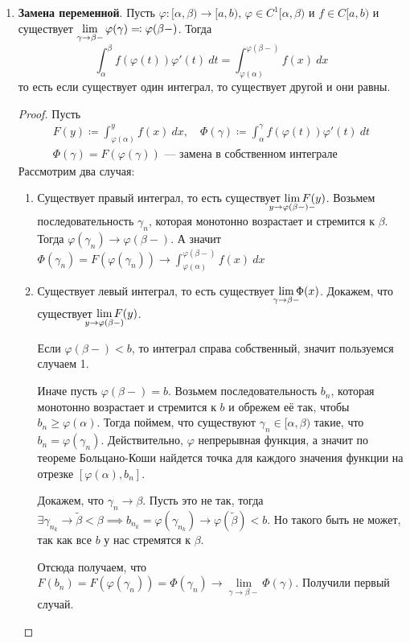 \begin{enumerate}
    \item \textbf{Замена переменной}. Пусть $\varphi\colon [\alpha, \beta) \to [a, b),\, \varphi \in C^{1}[\alpha, \beta)$ и $f \in C[a, b)$ и существует $\lim\limits_{\gamma \to \beta-}
  \varphi(\gamma) \leftcoleqq \varphi(\beta-)$. Тогда
    \begin{equation*}
      \int_{\alpha}^{\beta} f(\varphi(t))\varphi'(t) \: dt =
      \int_{\varphi(\alpha)}^{\varphi(\beta-)} f(x) \: dx
    \end{equation*}
  то есть если существует один интеграл, то существует другой и они равны.
  \begin{proof}
    Пусть
    \begin{equation*}
      \begin{gathered}
        F(y) \coloneqq \int_{\varphi(\alpha)}^{y} f(x) \: dx, \quad \Phi(\gamma) \coloneqq
        \int_{\alpha}^{\gamma} f(\varphi(t))\varphi'(t) \: dt \\
        \Phi(\gamma) = F(\varphi(\gamma))\text{ --- замена в собственном интеграле}
      \end{gathered}
    \end{equation*}
    Рассмотрим два случая:
    \begin{enumerate}[1)]
      \item Существует правый интеграл, то есть существует $\lim\limits_{\mathclap{y \to \varphi(\beta-)-}} F(y)$. Возьмем последовательность $\gamma_n$, которая монотонно возрастает и стремится к $\beta$. Тогда $\varphi(\gamma_n) \to \varphi(\beta-)$.
  А значит $\Phi(\gamma_n) = F(\varphi(\gamma_n)) \to \int_{\varphi(\alpha)}^{\varphi(\beta -)} f(x) \: dx$
      \item Существует левый интеграл, то есть существует $\lim\limits_{\mathclap{\gamma \to \beta-}}\Phi(x)$. Докажем, что существует $\lim\limits_{\mathclap{y \to \varphi(\beta -)}}F(y)$.

      Если $\varphi(\beta -) < b$, то интеграл справа собственный, значит пользуемся случаем 1.

      Иначе пусть $\varphi(\beta -) = b$. Возьмем последовательность $b_n$, которая монотонно возрастает и стремится к $b$ и обрежем её так, чтобы $b_n \geq \varphi(\alpha)$. Тогда поймем, что существуют $\gamma_n \in [\alpha, \beta)$ такие, что $b_n = \varphi(\gamma_n)$. Действительно, $\varphi$ непрерывная функция, а значит по теореме Больцано-Коши найдется точка для каждого значения функции на отрезке $[\varphi(\alpha), b_n]$.

      Докажем, что $\gamma_n \to \beta$. Пусть это не так, тогда $\exists \gamma_{n_k} \to \widetilde{\beta} < \beta \implies b_{n_k} = \varphi(\gamma_{n_k}) \to \varphi(\widetilde{\beta}) < b$. Но такого быть не может, так как все $b$ у нас стремятся к $\beta$.

      Отсюда получаем, что $F(b_n) = F(\varphi(\gamma_n)) = \Phi(\gamma_n) \to \lim\limits_{\gamma \to \beta-} \Phi(\gamma)$. Получили первый случай.
    \end{enumerate}
  \end{proof}
\end{enumerate}


